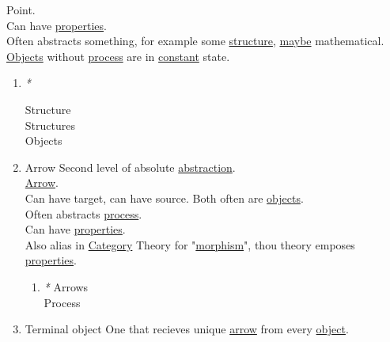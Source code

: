 \documentclass[a4paper,14pt,oneside]{book}
\begin{document}
Point.\\

Can have \hyperref[org5d2ad49]{properties}.\\

Often abstracts something, for example some \hyperref[org04b27c9]{structure}, \hyperref[org117baa8]{maybe} mathematical.\\

\hyperref[org7a81896]{Objects} without \hyperref[orgfdfd3f6]{process} are in \hyperref[org15ab12b]{constant} state.\\

\begin{enumerate}
\item \emph{*}
\label{sec:orgc782d54}

\label{org04b27c9}Structure\\
\label{org87ba85c}Structures\\
\label{org7a81896}Objects\\

\item \label{orga54a37d}Arrow
\label{sec:orgfcbe0d3}
Second level of absolute \hyperref[org4b78719]{abstraction}.\\

\hyperref[orga2011ae]{Arrow}.\\

Can have target, can have source. Both often are \hyperref[org7a81896]{objects}.\\

Often abstracts \hyperref[orgfdfd3f6]{process}.\\

Can have \hyperref[org5d2ad49]{properties}.\\

Also alias in \hyperref[org64eee11]{Category} Theory for "\hyperref[orgc00747d]{morphism}", thou theory emposes \hyperref[org5d2ad49]{properties}.\\

\begin{enumerate}
\item \emph{*}
\label{sec:org53e3b65}
\label{org9288797}Arrows\\
\label{orgfdfd3f6}Process\\
\end{enumerate}

\item \label{orgf5f11cd}Terminal object
\label{sec:org094990f}
One that recieves unique \hyperref[orga2011ae]{arrow} from every \hyperref[org75b9876]{object}.\\


\end{enumerate}
\end{document}
